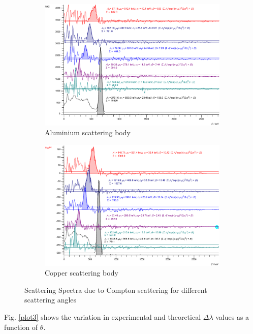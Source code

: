\begin{figure}
    \begin{subfigure}{\linewidth}
        \centering
        \includegraphics[width=0.9\columnwidth]{images/al_counts.pdf}
        \caption{Aluminium scattering body}
    \end{subfigure}
    \begin{subfigure}{\linewidth}
        \centering
        \includegraphics[width=0.9\columnwidth]{images/cu_counts.pdf}
        \caption{Copper scattering body}
    \end{subfigure}
    \caption{Scattering Spectra due to Compton scattering for different scattering angles}
    \label{plot1}
\end{figure}




Fig. \ref{plot3} shows the variation in experimental and theoretical $\Delta \lambda$ values as a function of $\theta$.


